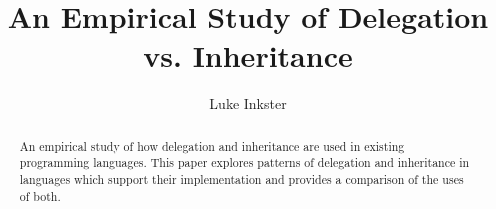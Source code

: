 \documentclass[11pt
              , a4paper
              , twoside
              , openright
              ]{report}
\title{An Empirical Study of Delegation vs. Inheritance}
\author{Luke Inkster}
\date{}
\begin{document}
\frontmatter



\begin{abstract}

An empirical study of how delegation and inheritance are used in existing programming languages. This paper explores patterns of delegation and inheritance in languages which support their implementation and provides a comparison of the uses of both.

\end{abstract}


\maketitle

%

\tableofcontents



\mainmatter






%


\backmatter


%


\end{document}
